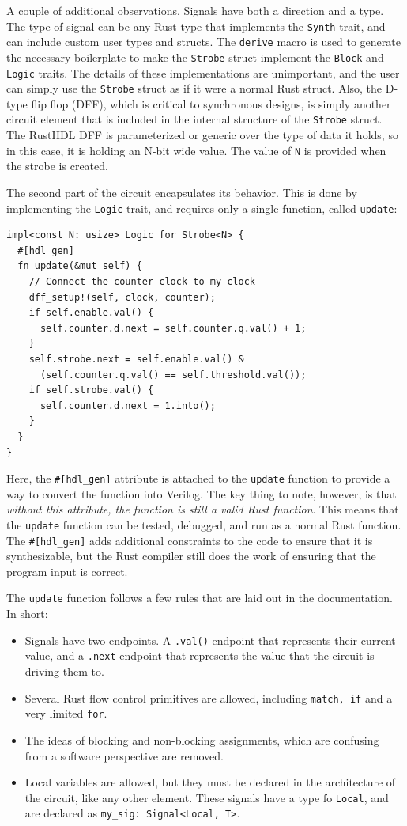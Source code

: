 \documentclass[conference]{IEEEtran}
\begin{document}
A couple of additional observations.  Signals have both a direction and a type.  The type of
signal can be any Rust type that implements the \verb|Synth| trait, and can include custom user
types and structs.  The \verb|derive| macro is used to generate the necessary boilerplate to make the 
\verb|Strobe| struct implement the \verb|Block| and \verb|Logic| traits.  The details of these implementations are
unimportant, and the user can simply use the \verb|Strobe| struct as if it were a normal Rust struct.  Also,
the D-type flip flop (DFF), which is critical to synchronous designs, is simply another circuit element that
is included in the internal structure of the \verb|Strobe| struct.  The RustHDL DFF is parameterized or 
generic over the type of data it holds, so in this case, it is holding an N-bit wide value.  The value of
\verb|N| is provided when the strobe is created.

The second part of the circuit encapsulates its behavior.  This is done by implementing the \verb|Logic| trait,
and requires only a single function, called \verb|update|:

\begin{verbatim}
impl<const N: usize> Logic for Strobe<N> {
  #[hdl_gen]
  fn update(&mut self) {
    // Connect the counter clock to my clock
    dff_setup!(self, clock, counter);
    if self.enable.val() {
      self.counter.d.next = self.counter.q.val() + 1;
    }
    self.strobe.next = self.enable.val() & 
      (self.counter.q.val() == self.threshold.val());
    if self.strobe.val() {
      self.counter.d.next = 1.into();
    }
  }
}
\end{verbatim}

Here, the \verb|#[hdl_gen]| attribute is attached to the \verb|update| function to provide a way to convert the function
into Verilog.  The key thing to note, however, is that \emph{without this attribute, the function is still a valid Rust function}.
This means that the \verb|update| function can be tested, debugged, and run as a normal Rust function.  The \verb|#[hdl_gen]| adds
additional constraints to the code to ensure that it is synthesizable, but the Rust compiler still does the work of ensuring that the 
program input is correct.

The \verb|update| function follows a few rules that are laid out in the documentation.  In short:
\begin{itemize}
  \item Signals have two endpoints.  A \verb|.val()| endpoint that represents their current value, and a \verb|.next| endpoint that represents
    the value that the circuit is driving them to.
  \item Several Rust flow control primitives are allowed, including \verb|match, if| and a very limited \verb|for|.  
  \item The ideas of blocking and non-blocking assignments, which are confusing from a software perspective are removed.  
  \item Local variables are allowed, but they must be declared in the architecture of the circuit, like any other element.
  These signals have a type fo \verb|Local|, and are declared as \verb|my_sig: Signal<Local, T>|.
\end{itemize}
\end{document}
